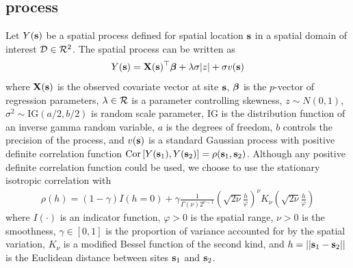 \documentclass[useAMS,usenatbib,referee]{biom}
\begin{document}
\subsection{\Skewt process} \label{sts:skewt}
Let $Y(\mbox{\bf s})$ be a spatial process defined for spatial location $\mbox{\bf s}$ in a spatial domain of interest $\calD \in \calR^2$.
The spatial \skewt process can be written as
\begin{align}
  Y(\bs) = \bX(\bs)^\top \bbeta + \lambda \sigma |z| + \sigma v(\bs) \label{steq:fullmodel}
\end{align}
where $\mbox{\bf X}(\mbox{\bf s})$ is the observed covariate vector at site $\mbox{\bf s}$, $\mbox{\boldmath $\beta$}$ is the $p$-vector of regression parameters, $\lambda \in \calR$ is a parameter controlling skewness, $z \sim N(0, 1)$, $\sigma^2 \sim \text{IG}(a / 2, b / 2)$ is random scale parameter, IG is the distribution function of an inverse gamma random variable, $a$ is the degrees of freedom, $b$ controls the precision of the process, and $v(\mbox{\bf s})$ is a standard Gaussian process with positive definite correlation function $\text{Cor} \left[Y(\mbox{\bf s}_1), Y(\mbox{\bf s}_2)\right] = \rho(\mbox{\bf s}_1, \mbox{\bf s}_2)$.
Although any positive definite correlation function could be used, we choose to use the stationary isotropic \Matern correlation with
\begin{align}
  \rho(h) = (1 - \gamma) I(h = 0) + \gamma \frac{ 1 }{ \Gamma(\nu) 2^{ \nu - 1}} \left( \sqrt{2\nu} \frac{ h }{ \varphi } \right)^{\nu} K_{\nu} \left( \sqrt{2\nu} \frac{ h }{ \varphi } \right) \label{steq:matern}
\end{align}
where $I(\cdot)$ is an indicator function, $\varphi > 0$ is the spatial range, $\nu > 0$ is the smoothness, $\gamma \in [0, 1]$ is the proportion of variance accounted for by the spatial variation, $K_\nu$ is a modified Bessel function of the second kind, and $h = || \mbox{\bf s}_1 - \mbox{\bf s}_2 ||$ is the Euclidean distance between sites $\mbox{\bf s}_1$ and $\mbox{\bf s}_2$.
\end{document}
